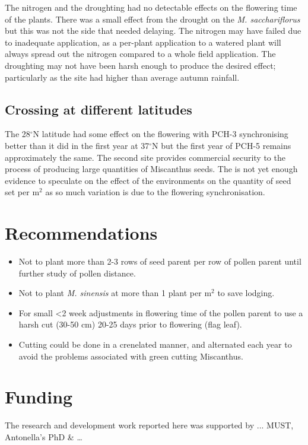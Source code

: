 \documentclass[fleqn, 15pt, lineno]{olplainarticle}
\begin{document}
The nitrogen and the droughting had no detectable effects on the flowering time of the plants.
There was a small effect from the drought on the \textit{M. sacchariflorus} but this was not the side that needed delaying.
The nitrogen may have failed due to inadequate application, as a per-plant application to a watered plant will always spread out the nitrogen compared to a whole field application.
The droughting may not have been harsh enough to produce the desired effect; particularly as the site had higher than average autumn rainfall.

\subsection{Crossing at different latitudes}
The 28$^{\circ}$N latitude had some effect on the flowering with PCH-3 synchronising better than it did in the first year at 37$^{\circ}$N but the first year of PCH-5 remains approximately the same.
The second site provides commercial security to the process of producing large quantities of Miscanthus seeds.
The is not yet enough evidence to speculate on the effect of the environments on the quantity of seed set per m$^2$ as so much variation is due to the flowering synchronisation.



\section{Recommendations}
\begin{itemize}
    \item Not to plant more than 2-3 rows of seed parent per row of pollen parent until further study of pollen distance.
    \item Not to plant \textit{M. sinensis} at more than 1 plant per m$^2$ to save lodging.
    \item For small <2 week adjustments in flowering time of the pollen parent to use a harsh cut (30-50 cm) 20-25 days prior to flowering (flag leaf).
    \item Cutting could be done in a crenelated manner, and alternated each year to avoid the problems associated with green cutting Miscanthus.
\end{itemize}






\section{Funding}
The research and development work reported here was supported by ... MUST, Antonella's PhD \& \dots
\end{document}
